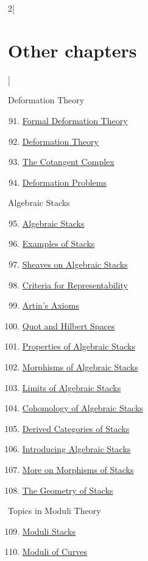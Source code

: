 \begin{multicols}{2}[\section{Other chapters}]
\begin{enumerate}
\end{enumerate}
Deformation Theory
\begin{enumerate}
\setcounter{enumi}{90}
\item \hyperref[formal-defos-section-phantom]{Formal Deformation Theory}
\item \hyperref[defos-section-phantom]{Deformation Theory}
\item \hyperref[cotangent-section-phantom]{The Cotangent Complex}
\item \hyperref[examples-defos-section-phantom]{Deformation Problems}
\end{enumerate}
Algebraic Stacks
\begin{enumerate}
\setcounter{enumi}{94}
\item \hyperref[algebraic-section-phantom]{Algebraic Stacks}
\item \hyperref[examples-stacks-section-phantom]{Examples of Stacks}
\item \hyperref[stacks-sheaves-section-phantom]{Sheaves on Algebraic Stacks}
\item \hyperref[criteria-section-phantom]{Criteria for Representability}
\item \hyperref[artin-section-phantom]{Artin's Axioms}
\item \hyperref[quot-section-phantom]{Quot and Hilbert Spaces}
\item \hyperref[stacks-properties-section-phantom]{Properties of Algebraic Stacks}
\item \hyperref[stacks-morphisms-section-phantom]{Morphisms of Algebraic Stacks}
\item \hyperref[stacks-limits-section-phantom]{Limits of Algebraic Stacks}
\item \hyperref[stacks-cohomology-section-phantom]{Cohomology of Algebraic Stacks}
\item \hyperref[stacks-perfect-section-phantom]{Derived Categories of Stacks}
\item \hyperref[stacks-introduction-section-phantom]{Introducing Algebraic Stacks}
\item \hyperref[stacks-more-morphisms-section-phantom]{More on Morphisms of Stacks}
\item \hyperref[stacks-geometry-section-phantom]{The Geometry of Stacks}
\end{enumerate}
Topics in Moduli Theory
\begin{enumerate}
\setcounter{enumi}{108}
\item \hyperref[moduli-section-phantom]{Moduli Stacks}
\item \hyperref[moduli-curves-section-phantom]{Moduli of Curves}

\end{enumerate}
\end{multicols}
